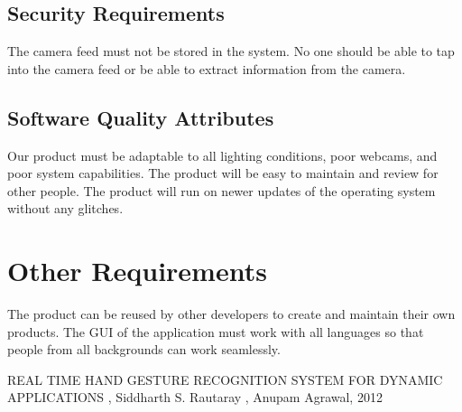 \documentclass{scrreprt}
\begin{document}
\section{Security Requirements}
The camera feed must not be stored in the system. No one should be able to tap into the camera feed or be able to extract information from the camera.

\section{Software Quality Attributes}

Our product must be adaptable to all lighting conditions, poor webcams, and poor system capabilities. The product will be easy to maintain and review for other people. The  product will run on newer updates of the operating system without any glitches.



\chapter{Other Requirements}

The product can be reused by other developers to create and maintain their own products. The GUI of the application must work with all languages so that people from all backgrounds can work seamlessly. 



\begin{thebibliography}{999}

\bibitem{ } REAL TIME HAND GESTURE RECOGNITION
SYSTEM FOR DYNAMIC APPLICATIONS , Siddharth S. Rautaray , Anupam Agrawal, 2012

\end{thebibliography}
\end{document}
